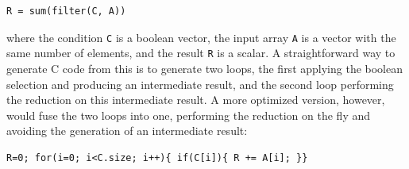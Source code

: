 \begin{small}
\begin{Verbatim}[xleftmargin=.3\columnwidth]
R = sum(filter(C, A))
\end{Verbatim}
\end{small}


\noindent{}where the condition \texttt{C} is a boolean vector, the input array \texttt{A}
is a vector with the same number of elements, and the result \texttt{R} is a
scalar.  A straightforward way to generate C code from this is to generate two loops, the first applying the boolean selection and producing an intermediate result, and the second loop performing the reduction on this intermediate result.  A more optimized version, however, would fuse the two loops into one, performing the reduction on the fly and avoiding the generation of an intermediate result:


\begin{small}
\begin{Verbatim}[xleftmargin=0\columnwidth]
  R=0; for(i=0; i<C.size; i++){ if(C[i]){ R += A[i]; }}
\end{Verbatim}
\end{small}




